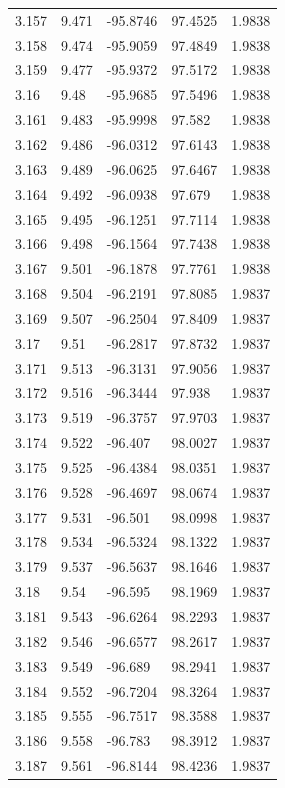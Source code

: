 \begin{tabular}{lllll}
3.157 & 9.471 & -95.8746 & 97.4525 & 1.9838 \\
3.158 & 9.474 & -95.9059 & 97.4849 & 1.9838 \\
3.159 & 9.477 & -95.9372 & 97.5172 & 1.9838 \\
3.16 & 9.48 & -95.9685 & 97.5496 & 1.9838 \\
3.161 & 9.483 & -95.9998 & 97.582 & 1.9838 \\
3.162 & 9.486 & -96.0312 & 97.6143 & 1.9838 \\
3.163 & 9.489 & -96.0625 & 97.6467 & 1.9838 \\
3.164 & 9.492 & -96.0938 & 97.679 & 1.9838 \\
3.165 & 9.495 & -96.1251 & 97.7114 & 1.9838 \\
3.166 & 9.498 & -96.1564 & 97.7438 & 1.9838 \\
3.167 & 9.501 & -96.1878 & 97.7761 & 1.9838 \\
3.168 & 9.504 & -96.2191 & 97.8085 & 1.9837 \\
3.169 & 9.507 & -96.2504 & 97.8409 & 1.9837 \\
3.17 & 9.51 & -96.2817 & 97.8732 & 1.9837 \\
3.171 & 9.513 & -96.3131 & 97.9056 & 1.9837 \\
3.172 & 9.516 & -96.3444 & 97.938 & 1.9837 \\
3.173 & 9.519 & -96.3757 & 97.9703 & 1.9837 \\
3.174 & 9.522 & -96.407 & 98.0027 & 1.9837 \\
3.175 & 9.525 & -96.4384 & 98.0351 & 1.9837 \\
3.176 & 9.528 & -96.4697 & 98.0674 & 1.9837 \\
3.177 & 9.531 & -96.501 & 98.0998 & 1.9837 \\
3.178 & 9.534 & -96.5324 & 98.1322 & 1.9837 \\
3.179 & 9.537 & -96.5637 & 98.1646 & 1.9837 \\
3.18 & 9.54 & -96.595 & 98.1969 & 1.9837 \\
3.181 & 9.543 & -96.6264 & 98.2293 & 1.9837 \\
3.182 & 9.546 & -96.6577 & 98.2617 & 1.9837 \\
3.183 & 9.549 & -96.689 & 98.2941 & 1.9837 \\
3.184 & 9.552 & -96.7204 & 98.3264 & 1.9837 \\
3.185 & 9.555 & -96.7517 & 98.3588 & 1.9837 \\
3.186 & 9.558 & -96.783 & 98.3912 & 1.9837 \\
3.187 & 9.561 & -96.8144 & 98.4236 & 1.9837 \\

\end{tabular}
